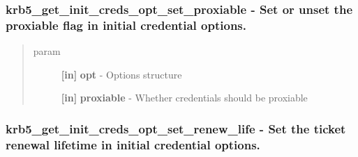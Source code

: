 \documentclass[letterpaper,10pt,english]{sphinxmanual}
\begin{document}
\subsubsection{krb5\_get\_init\_creds\_opt\_set\_proxiable -  Set or unset the proxiable flag in initial credential options.}
\label{appdev/refs/api/krb5_get_init_creds_opt_set_proxiable::doc}\label{appdev/refs/api/krb5_get_init_creds_opt_set_proxiable:krb5-get-init-creds-opt-set-proxiable-set-or-unset-the-proxiable-flag-in-initial-credential-options}

\begin{fulllineitems}
\label{appdev/refs/api/krb5_get_init_creds_opt_set_proxiable:c.krb5_get_init_creds_opt_set_proxiable}
\end{fulllineitems}

\begin{quote}\begin{description}
\item[{param}] \leavevmode
\textbf{{[}in{]}} \textbf{opt} - Options structure

\textbf{{[}in{]}} \textbf{proxiable} - Whether credentials should be proxiable

\end{description}\end{quote}


\subsubsection{krb5\_get\_init\_creds\_opt\_set\_renew\_life -  Set the ticket renewal lifetime in initial credential options.}
\label{appdev/refs/api/krb5_get_init_creds_opt_set_renew_life::doc}\label{appdev/refs/api/krb5_get_init_creds_opt_set_renew_life:krb5-get-init-creds-opt-set-renew-life-set-the-ticket-renewal-lifetime-in-initial-credential-options}

\begin{fulllineitems}
\label{appdev/refs/api/krb5_get_init_creds_opt_set_renew_life:c.krb5_get_init_creds_opt_set_renew_life}
\end{fulllineitems}
\end{document}
